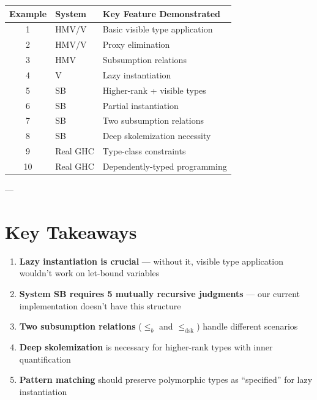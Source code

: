 \documentclass[11pt,a4paper]{article}
\begin{document}
\begin{center}
\begin{tabular}{|c|l|l|}
\hline
\textbf{Example} & \textbf{System} & \textbf{Key Feature Demonstrated} \\
\hline
1 & HMV/V & Basic visible type application \\
2 & HMV/V & Proxy elimination \\
3 & HMV & Subsumption relations \\
4 & V & Lazy instantiation \\
5 & SB & Higher-rank + visible types \\
6 & SB & Partial instantiation \\
7 & SB & Two subsumption relations \\
8 & SB & Deep skolemization necessity \\
9 & Real GHC & Type-class constraints \\
10 & Real GHC & Dependently-typed programming \\
\hline
\end{tabular}
\end{center}

---

\section{Key Takeaways}

\begin{enumerate}
\item \textbf{Lazy instantiation is crucial} --- without it, visible type application wouldn't work on let-bound variables

\item \textbf{System SB requires 5 mutually recursive judgments} --- our current implementation doesn't have this structure

\item \textbf{Two subsumption relations} ($\leq_b$ and $\leq_{\text{dsk}}$) handle different scenarios

\item \textbf{Deep skolemization} is necessary for higher-rank types with inner quantification

\item \textbf{Pattern matching} should preserve polymorphic types as ``specified'' for lazy instantiation
\end{enumerate}
\end{document}
